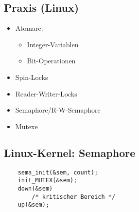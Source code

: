 \subsection{Praxis (Linux)}
\begin{itemize}
    \item Atomare:
    \begin{itemize}
        \item Integer-Variablen
        \item Bit-Operationen
    \end{itemize}
    \item Spin-Locks
    \item Reader-Writer-Locks
    \item Semaphore/R-W-Semaphore
    \item Mutexe
\end{itemize}

\subsection{Linux-Kernel: Semaphore}
\begin{lstlisting}
    sema_init(&sem, count);
    init_MUTEX(&sem);
    down(&sem)
        /* kritischer Bereich */
    up(&sem);
\end{lstlisting}